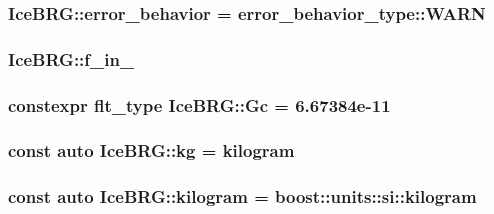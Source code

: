 \hypertarget{namespaceIceBRG_a7c664338d0bd76bc09ed343d7478e65f}{
\subsubsection[{error\-\_\-behavior}]{ Ice\-B\-R\-G\-::error\-\_\-behavior = error\-\_\-behavior\-\_\-type\-::\-W\-A\-R\-N}}\label{namespaceIceBRG_a7c664338d0bd76bc09ed343d7478e65f}
\hypertarget{namespaceIceBRG_adc45d5d0dcb62999139c819c97077451}{
\subsubsection[{f\-\_\-in\-\_\-2}]{\setlength{\rightskip}{0pt plus 5cm}Ice\-B\-R\-G\-::f\-\_\-in\-\_}}\label{namespaceIceBRG_adc45d5d0dcb62999139c819c97077451}
\hypertarget{namespaceIceBRG_ae34ca33d4c7073fde8efcc53cf6fd5f4}{
\subsubsection[{Gc}]{\setlength{\rightskip}{0pt plus 5cm}constexpr {\bf flt\-\_\-type} Ice\-B\-R\-G\-::\-Gc = 6.\-67384e-\/11}}\label{namespaceIceBRG_ae34ca33d4c7073fde8efcc53cf6fd5f4}
\hypertarget{namespaceIceBRG_a9233960f6792ea35145d7db55c13e85d}{
\subsubsection[{kg}]{\setlength{\rightskip}{0pt plus 5cm}const auto Ice\-B\-R\-G\-::kg = {\bf kilogram}}}\label{namespaceIceBRG_a9233960f6792ea35145d7db55c13e85d}
\hypertarget{namespaceIceBRG_aaf220eb7f44e1dc31c74784c7e1ff646}{
\subsubsection[{kilogram}]{\setlength{\rightskip}{0pt plus 5cm}const auto Ice\-B\-R\-G\-::kilogram = boost\-::units\-::si\-::kilogram}}\label{namespaceIceBRG_aaf220eb7f44e1dc31c74784c7e1ff646}
